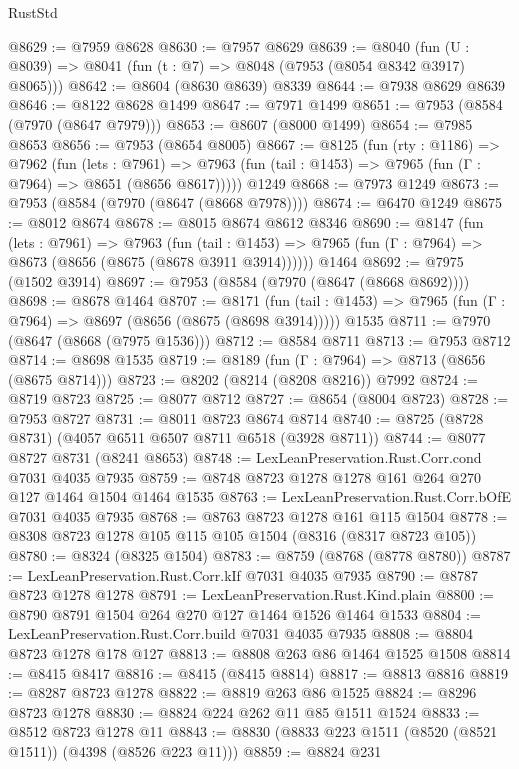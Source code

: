 \begin{lexlean}{RustStd}
\begin{coremodule}
@8629 := @7959 @8628
@8630 := @7957 @8629
@8639 := @8040 (fun (U : @8039) => @8041 (fun (t : @7) => @8048 (@7953 (@8054 @8342 @3917) @8065)))
@8642 := @8604 (@8630 @8639) @8339
@8644 := @7938 @8629 @8639
@8646 := @8122 @8628 @1499
@8647 := @7971 @1499
@8651 := @7953 (@8584 (@7970 (@8647 @7979)))
@8653 := @8607 (@8000 @1499)
@8654 := @7985 @8653
@8656 := @7953 (@8654 @8005)
@8667 := @8125
    (fun (rty : @1186) =>
    @7962
      (fun (lets : @7961) =>
      @7963 (fun (tail : @1453) => @7965 (fun (Γ : @7964) => @8651 (@8656 @8617)))))
    @1249
@8668 := @7973 @1249
@8673 := @7953 (@8584 (@7970 (@8647 (@8668 @7978))))
@8674 := @6470 @1249
@8675 := @8012 @8674
@8678 := @8015 @8674 @8612 @8346
@8690 := @8147
    (fun (lets : @7961) =>
    @7963
      (fun (tail : @1453) => @7965 (fun (Γ : @7964) => @8673 (@8656 (@8675 (@8678 @3911 @3914))))))
    @1464
@8692 := @7975 (@1502 @3914)
@8697 := @7953 (@8584 (@7970 (@8647 (@8668 @8692))))
@8698 := @8678 @1464
@8707 := @8171
    (fun (tail : @1453) => @7965 (fun (Γ : @7964) => @8697 (@8656 (@8675 (@8698 @3914)))))
    @1535
@8711 := @7970 (@8647 (@8668 (@7975 @1536)))
@8712 := @8584 @8711
@8713 := @7953 @8712
@8714 := @8698 @1535
@8719 := @8189 (fun (Γ : @7964) => @8713 (@8656 (@8675 @8714)))
@8723 := @8202 (@8214 (@8208 @8216)) @7992
@8724 := @8719 @8723
@8725 := @8077 @8712
@8727 := @8654 (@8004 @8723)
@8728 := @7953 @8727
@8731 := @8011 @8723 @8674 @8714
@8740 := @8725 (@8728 @8731) (@4057 @6511 @6507 @8711 @6518 (@3928 @8711))
@8744 := @8077 @8727 @8731 (@8241 @8653)
@8748 := LexLeanPreservation.Rust.Corr.cond @7031 @4035 @7935
@8759 := @8748 @8723 @1278 @1278 @161 @264 @270 @127 @1464 @1504 @1464 @1535
@8763 := LexLeanPreservation.Rust.Corr.bOfE @7031 @4035 @7935
@8768 := @8763 @8723 @1278 @161 @115 @1504
@8778 := @8308 @8723 @1278 @105 @115 @105 @1504 (@8316 (@8317 @8723 @105))
@8780 := @8324 (@8325 @1504)
@8783 := @8759 (@8768 (@8778 @8780))
@8787 := LexLeanPreservation.Rust.Corr.kIf @7031 @4035 @7935
@8790 := @8787 @8723 @1278 @1278
@8791 := LexLeanPreservation.Rust.Kind.plain
@8800 := @8790 @8791 @1504 @264 @270 @127 @1464 @1526 @1464 @1533
@8804 := LexLeanPreservation.Rust.Corr.build @7031 @4035 @7935
@8808 := @8804 @8723 @1278 @178 @127
@8813 := @8808 @263 @86 @1464 @1525 @1508
@8814 := @8415 @8417
@8816 := @8415 (@8415 @8814)
@8817 := @8813 @8816
@8819 := @8287 @8723 @1278
@8822 := @8819 @263 @86 @1525
@8824 := @8296 @8723 @1278
@8830 := @8824 @224 @262 @11 @85 @1511 @1524
@8833 := @8512 @8723 @1278 @11
@8843 := @8830 (@8833 @223 @1511 (@8520 (@8521 @1511)) (@4398 (@8526 @223 @11)))
@8859 := @8824
    @231

\end{coremodule}
\end{lexlean}
